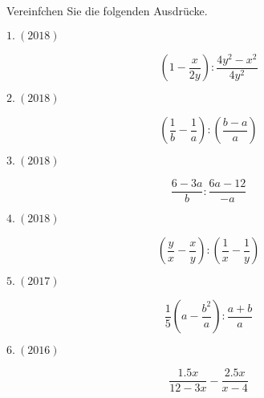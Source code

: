 




\usepackage{amssymb} %
\renewcommand{\metaHeaderLine}{Arbeitsblatt}
\renewcommand{\arbeitsblattTitel}{Bruchrechnen (alte GESO Maturaaufgaben)}

\arbeitsblattHeader{}
Vereinfchen Sie die folgenden Ausdrücke.

$1.\ (2018)$

$$\left(1-\frac{x}{2y}\right) : \frac{4y^2 - x^2}{4y^2} $$



$2.\ (2018)$

$$\left(\frac{1}{b} - \frac{1}{a}\right) : \left(\frac{b-a}{a}\right)$$



$3.\ (2018)$

$$\frac{6-3a}{b} : \frac{6a-12}{-a}$$



$4.\ (2018)$

$$\left(\frac{y}{x} - \frac{x}{y}\right) : \left(\frac{1}{x}
- \frac{1}{y}\right)$$



$5.\ (2017)$

$$\frac{1}{5}\left(a-\frac{b^2}{a}\right) : \frac{a+b}{a}$$



$6.\ (2016)$

$$\frac{1.5x}{12-3x} - \frac{2.5x}{x-4}$$




